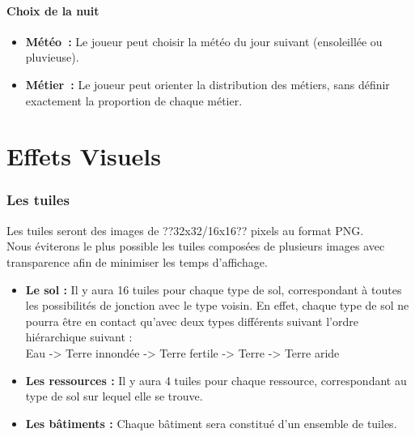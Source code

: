 \documentclass[a4paper]{article}
\begin{document}
      \subsection{Choix de la nuit}
        \begin{itemize}
          \item \textbf{Météo :} \small{ Le joueur peut choisir la météo du jour suivant (ensoleillée ou pluvieuse).}
          \item \textbf{Métier :} \small{ Le joueur peut orienter la distribution des métiers, sans définir exactement la proportion de chaque métier.}
        \end{itemize}


  \newpage
  \part{Effets Visuels}


    \section{Les tuiles}
      Les tuiles seront des images de ??32x32/16x16?? pixels au format PNG.\\
      Nous éviterons le plus possible les tuiles composées de plusieurs images avec transparence afin de minimiser les temps d'affichage.
      \begin{itemize}
        \item \textbf{Le sol :}\small{ Il y aura 16 tuiles pour chaque type de sol, correspondant à toutes les possibilités de jonction avec le type voisin. En effet, chaque type de sol ne pourra être en contact qu'avec deux types différents suivant l'ordre hiérarchique suivant :\\
          Eau -> Terre innondée -> Terre fertile -> Terre -> Terre aride}
        \item \textbf{Les ressources :}\small{ Il y aura 4 tuiles pour chaque ressource, correspondant au type de sol sur lequel elle se trouve.}
        \item \textbf{Les bâtiments :}\small{ Chaque bâtiment sera constitué d'un ensemble de tuiles.}
      \end{itemize}
  
\end{document}
